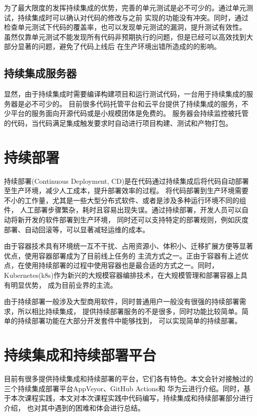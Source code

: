 为了最大限度的发挥持续集成的优势，完善的单元测试是必不可少的。通过单元测试，持续集成时可以确认对代码的修改与之前
实现的功能没有冲突。同时，通过检查单元测试下代码的覆盖率，也可以发现单元测试的漏洞，提升测试有效性。
虽然仅靠单元测试不能发现所有代码非预期执行的问题，但是已经可以高效找到大部分显著的问题，避免了代码上线后
在生产环境出错所造成的的影响。

\subsection{持续集成服务器}
显然，由于持续集成时需要编译构建项目和运行测试代码，一台用于持续集成的服务器是必不可少的。
目前很多代码托管平台和云平台提供了持续集成的服务，不少平台的服务面向开源代码或是小规模团体是免费的。
服务器会持续监控被托管的代码，当代码满足集成触发要求时自动进行项目构建、测试和产物打包。

\section{持续部署}

持续部署(Continuous Deployment, CD)是在代码通过持续集成后将代码自动部署至生产环境，减少人工成本，提升部署效率的过程。
将代码部署到生产环境需要不小的工作量，尤其是一些大型分布式软件、或者是涉及多种运行环境不同的组件，
人工部署步骤繁杂，耗时且容易出现失误。通过持续部署，开发人员可以自动将新开发的软件部署到生产环境，
同时还可以支持特定的部署规则，例如灰度部署、自动回滚等，可以显著减轻运维的成本。

由于容器技术具有环境统一互不干扰、占用资源小、体积小、迁移扩展方便等显著优点，使用容器部署成为了目前线上任务的
主流方式之一。正由于容器有上述优点，在使用持续部署的过程中使用容器也是最合适的方式之一。同时，
Kubernetes(k8s)作为新兴的大规模容器编排技术，在大规模管理和部署容器上具有明显优势，
成为目前业界的主流。

由于持续部署一般涉及大型商用软件，同时普通用户一般没有很强的持续部署需求，所以相比持续集成，
提供持续部署服务的不是很多，同时功能比较简单。简单的持续部署功能在大部分开发套件中能够找到，
可以实现简单的持续部署。

\section{持续集成和持续部署平台}

目前有很多提供持续集成和持续部署的平台，它们各有特色。本文会针对接触过的三个持续集成部署平台AppVeyor、GitHub Actions和
华为云进行介绍。同时，基于本次课程实践，本文对本次课程实践中代码编写，持续集成和持续部署部分进行介绍，
也对其中遇到的困难和体会进行总结。